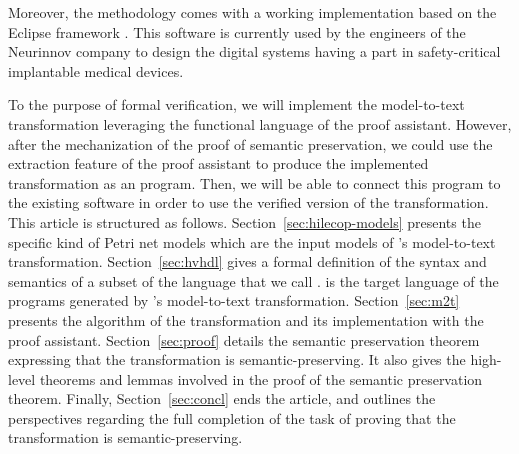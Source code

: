 Moreover, the \hilecop{} methodology comes with a working
implementation based on the Eclipse framework . This software is
currently used by the engineers of the Neurinnov company to design the
digital systems having a part in safety-critical implantable medical
devices.

To the purpose of formal verification, we will implement the
\hilecop{} model-to-text transformation leveraging the functional
language of the \coq{} proof assistant. However, after the
mechanization of the proof of semantic preservation, we could use the
extraction feature of the \coq{} proof assistant to produce the
implemented transformation as an \ocaml{} program. Then, we will be
able to connect this program to the existing \hilecop{} software in
order
to use the verified version of the transformation.\\

This article is structured as
follows. Section~\ref{sec:hilecop-models} presents the specific kind
of Petri net models which are the input models of \hilecop{}'s
model-to-text transformation.  Section~\ref{sec:hvhdl} gives a formal
definition of the syntax and semantics of a subset of the \vhdl{}
language that we call \hvhdl{}. \hvhdl{} is the target language of the
programs generated by \hilecop{}'s model-to-text transformation.
Section~\ref{sec:m2t} presents the algorithm of the transformation and
its implementation with the \coq{} proof assistant.
Section~\ref{sec:proof} details the semantic preservation theorem
expressing that the \hilecop{} transformation is semantic-preserving.
It also gives the high-level theorems and lemmas involved in the proof
of the semantic preservation theorem.  Finally,
Section~\ref{sec:concl} ends the article, and outlines the
perspectives regarding the full completion of the task of proving that
the \hilecop{} transformation is semantic-preserving.

